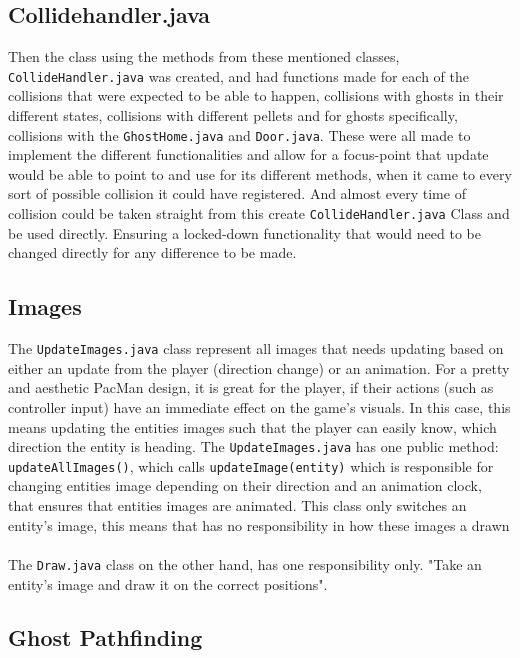 \documentclass[a4paper,5pt]{article}
\begin{document}
\subsection{Collidehandler.java}
Then the class using the methods from these mentioned classes, \texttt{CollideHandler.java} was created, and had functions made for each of the collisions that were expected to be able to happen, collisions with ghosts in their different states, collisions with different pellets and for ghosts specifically, collisions with the \texttt{GhostHome.java} and \texttt{Door.java}. These were all made to implement the different functionalities and allow for a focus-point that update would be able to point to and use for its different methods, when it came to every sort of possible collision it could have registered. And almost every time of collision could be taken straight from this create \texttt{CollideHandler.java} Class and be used directly. Ensuring a locked-down functionality that would need to be changed directly for any difference to be made. 

\subsection{Images}
The \texttt{UpdateImages.java} class represent all images that needs updating based on either an update from the player (direction change) or an animation. For a pretty and aesthetic PacMan design, it is great for the player, if their actions (such as controller input) have an immediate effect on the game's visuals. In this case, this means updating the  entities images such that the player can easily know, which direction the entity is heading. The \texttt{UpdateImages.java} has one public method: \texttt{updateAllImages()}, which calls \texttt{updateImage(entity)} which is responsible for changing entities image depending on their direction and an animation clock, that ensures that entities images are animated. This class only switches an entity's image, this means that has no responsibility in how these images a drawn\\\\ The \texttt{Draw.java} class on the other hand, has one responsibility only. "Take an entity's image and draw it on the correct positions".

\newpage
\subsection{Ghost Pathfinding}
\end{document}
